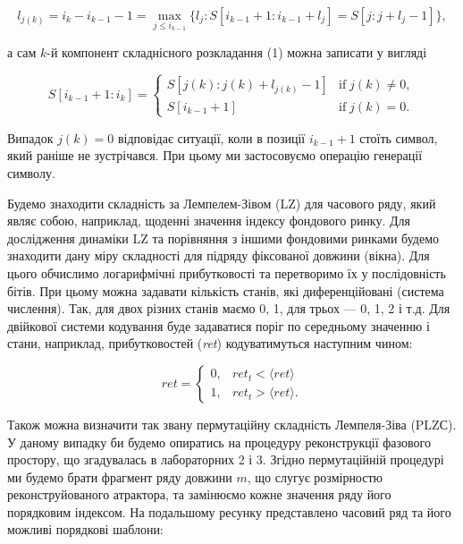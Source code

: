 \documentclass[
  letterpaper,
]{report}
\begin{document}
\[
l_{j(k)} = i_k - i_{k-1} - 1 = \max_{j \leq i_{k-1}}\{ l_{j} : S[i_{k-1}+1:i_{k-1}+l_j]=S[j:j+l_{j}-1] \}, \tag{2}
\]

а сам \(k\)-й компонент складнісного розкладання (1) можна записати у
вигляді

\[
S[i_{k-1}+1:i_{k}] = 
\begin{cases}
    S[j(k):j(k)+l_{j(k)}-1] & \textrm{if} \; j(k) \neq 0, \\
    S[i_{k-1}+1] & \textrm{if} \; j(k) = 0.
\end{cases} \tag{3}
\]

Випадок \(j(k) = 0\) відповідає ситуації, коли в позиції \(i_{k−1}+1\)
стоїть символ, який раніше не зустрічався. При цьому ми застосовуємо
операцію генерації символу.

Будемо знаходити складність за Лемпелем-Зівом (LZ) для часового ряду,
який являє собою, наприклад, щоденні значення індексу фондового ринку.
Для дослідження динаміки LZ та порівняння з іншими фондовими ринками
будемо знаходити дану міру складності для підряду фіксованої довжини
(вікна). Для цього обчислимо логарифмічні прибутковості та перетворимо
їх у послідовність бітів. При цьому можна задавати кількість станів, які
диференційовані (система числення). Так, для двох різних станів маємо 0,
1, для трьох --- 0, 1, 2 і т.д. Для двійкової системи кодування буде
задаватися поріг по середньому значенню і стани, наприклад,
прибутковостей (\emph{ret}) кодуватимуться наступним чином:

\[
ret = 
\begin{cases}
0, & ret_t < \langle ret \rangle \\
1, & ret_t > \langle ret \rangle.
\end{cases} \tag{4}
\]

Також можна визначити так звану пермутаційну складність Лемпеля-Зіва
(PLZС). У даному випадку би будемо опиратись на процедуру реконструкції
фазового простору, що згадувалась в лабораторних 2 і 3. Згідно
пермутаційній процедурі ми будемо брати фрагмент ряду довжини \(m\), що
слугує розмірностю реконструйованого атрактора, та замінюємо кожне
значення ряду його порядковим індексом. На подальшому ресунку
представлено часовий ряд та його можливі порядкові шаблони:
\end{document}
